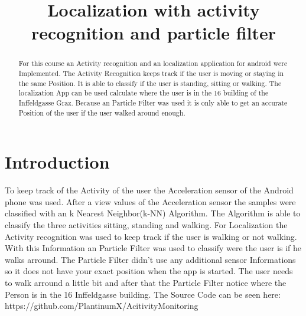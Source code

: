 \documentclass[conference]{IEEEtran}
\begin{document}
\title{Localization with activity recognition and particle filter\\}

\author{
\and
{}
}

\maketitle

\begin{abstract}
For this course an Activity recognition and an localization application for android were Implemented. The Activity Recognition keeps track if the user is moving or staying in the same Position. It is able to classify if the user is standing, sitting or walking. The localization App can be used calculate where the user is in the 16 building of the Inffeldgasse Graz. Because an Particle Filter was used it is only able to get an accurate Position of the user if the user walked around enough.
\end{abstract}

\section{Introduction}
To keep track of the Activity of the user the Acceleration sensor of the Android phone was used. After a view values of the Acceleration sensor the samples were classified with an k Nearest Neighbor(k-NN) Algorithm. The Algorithm is able to classify the three activities sitting, standing and walking. For Localization the Activity recognition was used to keep track if the user is walking or not walking. With this Information an Particle Filter was used to classify were the user is if he walks arround. The Particle Filter didn't use any additional sensor Informations so it does not have your exact   position when the app is started. The user needs to walk arround a little bit and after that the Particle Filter notice where the Person is in the 16 Inffeldgasse building.
The Source Code can be seen here: https://github.com/PlantinumX/AcitivityMonitoring
\end{document}
